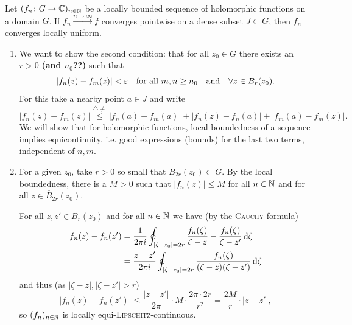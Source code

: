 \documentclass[a4paper,english]{article}
\begin{document}


\begin{lemma} \label{lemma:pointwise}
    Let $(f_n \colon G \to \operatorname{\mathbb{C}})_{n \in \operatorname{\mathbb{N}}}$ be a locally bounded sequence of holomorphic functions on a domain $G$.
    If $f_n \xrightarrow{n \to \infty} f$ converges pointwise on a dense subset $J \subset G$, then $f_n$ converges locally uniform.
\end{lemma}

\begin{pr}
    \begin{enumerate}
        \item 
        We want to show the second condition: that for all $z_0 \in G$ there exists an $r > 0$ \textbf{(and $n_0$??)} such that
        \begin{equation*}
            | f_n(z) - f_m(z) | < \varepsilon
            \quad \text{for all } m, n \ge n_0
            \quad \text{and} \quad \forall z \in B_r(z_0).
        \end{equation*}
        For this take a nearby point $a \in J$ and write
        \begin{equation*}
            | f_n(z) - f_m(z) |
            \overset{\triangle \ne}{\le} | f_n(a) - f_m(a) | + | f_n(z) - f_n(a) | + | f_m(a) - f_m(z) |.
        \end{equation*}
        We will show that for holomorphic functions, local boundedness of a sequence implies equicontinuity, i.e. good expressions (bounds) for the last two terms, independent of $n, m$.
        
        \item
        For a given $z_0$, take $r > 0$ so small that $\overline{B}_{2 r}(z_0) \subset G$.
        By the local boundedness, there is a $M > 0$ such that $| f_n(z) | \le M$ for all $n \in \operatorname{\mathbb{N}}$ and for all $z \in \overline{B}_{2 r}(z_0)$. 
    
        For all $z, z' \in B_r(z_0)$ and for all $n \in \operatorname{\mathbb{N}}$ we have (by the \textsc{Cauchy} formula)
        \begin{align*}
            f_n(z) - f_n(z')
            & = \frac{1}{2 \pi i} \oint_{| \zeta - z_0 | = 2 r} \frac{f_n(\zeta)}{\zeta - z} - \frac{f_n(\zeta)}{\zeta - z'} \mathop{}\!\mathrm{d}{\zeta} \\
            & = \frac{z - z'}{2 \pi i} \oint_{| \zeta - z_0 | = 2 r} \frac{f_n(\zeta)}{(\zeta - z)(\zeta - z')} \mathop{}\!\mathrm{d}{\zeta}
        \end{align*}
        and thus (as $| \zeta - z |, | \zeta - z' | > r$)
        \begin{equation*}
            | f_n(z) - f_n(z') |
            \le \frac{| z - z' |}{2 \pi} \cdot M \cdot \frac{2 \pi \cdot 2 r}{r^2}
            = \frac{2 M}{r} \cdot | z - z' |,
        \end{equation*}
        so $(f_n)_{n \in \operatorname{\mathbb{N}}}$ is locally equi-\textsc{Lipschitz}-continuous.
        

\end{enumerate}
\end{pr}
\end{document}
